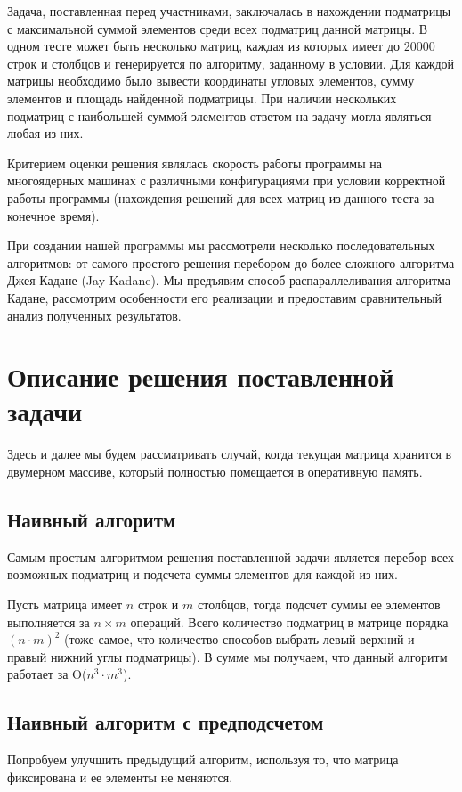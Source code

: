 \documentclass[12pt,a4paper]{article}
\begin{document}
Задача, поставленная перед участниками, заключалась в нахождении подматрицы с максимальной суммой элементов среди всех подматриц данной матрицы. В одном тесте может быть несколько матриц, каждая из которых имеет до 20000 строк и столбцов и генерируется по алгоритму, заданному в условии. Для каждой матрицы необходимо было вывести координаты угловых элементов, сумму элементов и площадь найденной подматрицы. При наличии нескольких подматриц с наибольшей суммой элементов ответом на задачу могла являться любая из них.

Критерием оценки решения являлась скорость работы программы на многоядерных машинах с различными конфигурациями при условии корректной работы программы (нахождения решений для всех матриц из данного теста за конечное время).

При создании нашей программы мы рассмотрели несколько последовательных алгоритмов: от самого простого решения перебором до более сложного алгоритма Джея Кадане (Jay Kadane). Мы предъявим способ распараллеливания алгоритма Кадане, рассмотрим особенности его реализации и предоставим сравнительный анализ полученных результатов.

\newpage
\section{Описание решения поставленной задачи}
Здесь и далее мы будем рассматривать случай, когда текущая матрица хранится в двумерном массиве, который полностью помещается в оперативную память.
\subsection{Наивный алгоритм}
Самым простым алгоритмом решения поставленной задачи является перебор всех возможных подматриц и подсчета суммы элементов для каждой из них.

Пусть матрица имеет $n$ строк и $m$ столбцов, тогда подсчет суммы ее элементов выполняется за $n \times m$ операций. Всего количество подматриц в матрице порядка $(n \cdot m)^2$ (тоже самое, что количество способов выбрать левый верхний и правый нижний углы подматрицы). В сумме мы получаем, что данный алгоритм работает за O($n^3 \cdot m^3$). 
\subsection{Наивный алгоритм с предподсчетом}
Попробуем улучшить предыдущий алгоритм, используя то, что матрица фиксирована и ее элементы не меняются.
\end{document}
